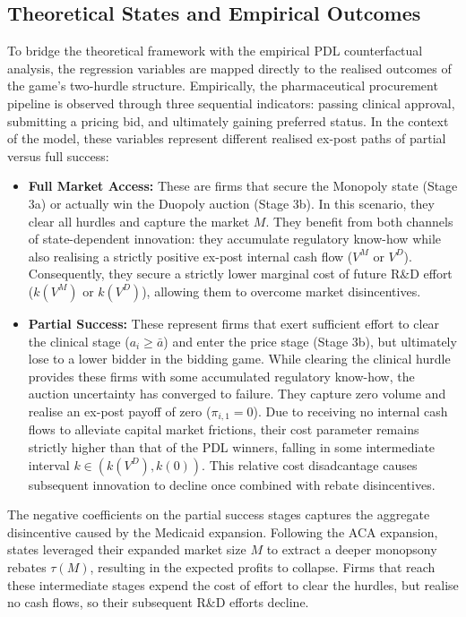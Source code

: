 \documentclass[12pt]{article}
\begin{document}
\subsection{Theoretical States and Empirical Outcomes}
To bridge the theoretical framework with the empirical PDL counterfactual analysis, the regression variables are mapped directly to the realised outcomes of the game's two-hurdle structure.  Empirically, the pharmaceutical procurement pipeline is observed through three sequential indicators: passing clinical approval, submitting a pricing bid, and ultimately gaining preferred status.  In the context of the model, these variables represent different realised ex-post paths of partial versus full success:

\begin{itemize}
    \item \textbf{Full Market Access:} These are firms that secure the Monopoly state (Stage 3a) or actually win the Duopoly auction (Stage 3b). In this scenario, they clear all hurdles and capture the market $M$. They benefit from both channels of state-dependent innovation: they accumulate regulatory know-how while also realising a strictly positive ex-post internal cash flow ($V^M$ or $V^D$). Consequently, they secure a strictly lower marginal cost of future R\&D effort ($k(V^M)$ or $k(V^D)$), allowing them to overcome market disincentives.
    
    \item \textbf{Partial Success:} These represent firms that exert sufficient effort to clear the clinical stage ($a_i \ge \bar{a}$) and enter the price stage (Stage 3b), but ultimately lose to a lower bidder in the bidding game. While clearing the clinical hurdle provides these firms with some accumulated regulatory know-how, the auction uncertainty has converged to failure. They capture zero volume and realise an ex-post payoff of zero ($\pi_{i,1} = 0$). Due to receiving no internal cash flows to alleviate capital market frictions, their cost parameter remains strictly higher than that of the PDL winners, falling in some intermediate interval $k \in (k(V^D), k(0))$. This relative cost disadcantage causes subsequent innovation to decline once combined with rebate disincentives.
\end{itemize}

The negative coefficients on the partial success stages captures the aggregate disincentive caused by the Medicaid expansion. Following the ACA expansion, states leveraged their expanded market size $M$ to extract a deeper monopsony rebates $\tau(M)$, resulting in the expected profits to collapse. Firms that reach these intermediate stages expend the cost of effort to clear the hurdles, but realise no cash flows, so their subsequent R\&D efforts decline.
\end{document}
